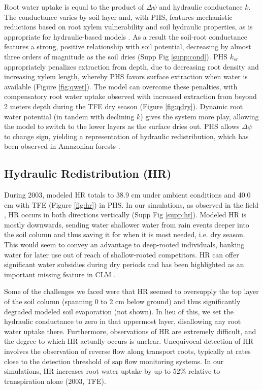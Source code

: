 \documentclass[draft,linenumbers]{agujournal}
\begin{document}
    Root water uptake is equal to the product of $\Delta\psi$ and hydraulic conductance $k$. 
    The conductance varies by soil layer and, with PHS, features mechanistic reductions based on root xylem vulnerability and soil hydraulic properties, 
    as is appropriate for hydraulic-based models \citep{cai2014,warren2014}.
    As a result the soil-root conductance features a strong, positive relationship with soil potential, decreasing by almost three orders of magnitude as the soil dries (Supp Fig \ref{supp:cond}).
    PHS $k_{sr}$ appropriately penalizes extraction from depth, due to decreasing root density and increasing xylem length, 
    whereby PHS favors surface extraction when water is available (Figure \ref{fig:qwet}).
    The model can overcome these penalties, with compensatory root water uptake observed with increased extraction from beyond 2 meters depth during the TFE dry season (Figure \ref{fig:qdry}).
    Dynamic root water potential (in tandem with declining $k$) gives the system more play, allowing the model to switch to the lower layers as the surface dries out.
    PHS allows $\Delta\psi$ to change sign, yielding a representation of hydraulic redistribution, which has been observed in Amazonian forests \citep{oliveira2005}.
    
\subsection{Hydraulic Redistribution (HR)}
    During 2003, modeled HR totals to 38.9 cm under ambient conditions and 40.0 cm with TFE (Figure \ref{fig:hr}) in PHS.
    In our simulations, as observed in the field \citep{burgess1998}, HR occurs in both directions vertically (Supp Fig \ref{supp:hr}).
    Modeled HR is mostly downwards, sending water shallower water from rain events deeper into the soil column and thus saving it for when it is most needed, i.e. dry season.
    This would seem to convey an advantage to deep-rooted individuals, banking water for later use out of reach of shallow-rooted competitors.
    HR can offer significant water subsidies during dry periods \citep{jackson2000} and has been highlighted as an important missing feature in CLM \citep{lee2005}.
    
    Some of the challenges we faced were that HR seemed to oversupply the top layer of the soil column (spanning 0 to 2 cm below ground) and thus significantly degraded modeled soil evaporation (not shown). 
    In lieu of this, we set the hydraulic conductance to zero in that uppermost layer, disallowing any root water uptake there.
    Furthermore, observations of HR are extremely difficult, and the degree to which HR actually occurs is unclear. 
    Unequivocal detection of HR involves the observation of reverse flow along transport roots, typically at rates close to the detection threshold of sap flow monitoring systems. 
    In our simulations, HR increases root water uptake by up to 52\% relative to transpiration alone (2003, TFE). 
    
\end{document}

